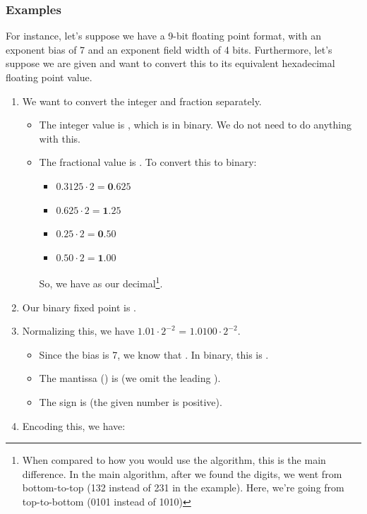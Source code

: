 \documentclass[letterpaper]{article}
\begin{document}
\subsubsection{Examples}
For instance, let's suppose we have a 9-bit floating point format, with an exponent bias of 7 and an exponent field width of 4 bits. Furthermore, let's suppose we are given  and want to convert this to its equivalent hexadecimal floating point value. 
\begin{enumerate}[(1)]
    \item We want to convert the integer and fraction separately. 
    \begin{itemize}
        \item The integer value is , which is  in binary. We do not need to do anything with this. 
        \item The fractional value is . To convert this to binary:
        \begin{itemize}
            \item $0.3125 \cdot 2 = \mathbf{0}.625$
            \item $0.625 \cdot 2 = \mathbf{1}.25$
            \item $0.25 \cdot 2 = \mathbf{0}.50$
            \item $0.50 \cdot 2 = \mathbf{1}.00$
        \end{itemize}
        So, we have  as our decimal\footnote{When compared to how you would use the algorithm, this is the main difference. In the main algorithm, after we found the digits, we went from bottom-to-top (132 instead of 231 in the example). Here, we're going from top-to-bottom (0101 instead of 1010)}.  
    \end{itemize}
    \item Our binary fixed point is . 
    \item Normalizing this, we have $1.01 \cdot 2^{-2}$ = $1.0100 \cdot 2^{-2}$. 
    \begin{itemize}
        \item Since the bias is 7, we know that . In binary, this is . 
        \item The mantissa () is  (we omit the leading ). 
        \item The sign is  (the given number is positive).
    \end{itemize}
    \item Encoding this, we have:

\end{enumerate}
\end{document}
